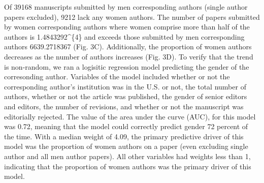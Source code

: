 \documentclass[11pt,]{article}
\begin{document}
Of 39168 manuscripts submitted by men corresponding authors (single
author papers excluded), 9212 lack any women authors. The number of
papers submitted by women corresponding authors where women comprise
more than half of the authors is 1.4843292\^{}\{4\} and exceeds
those submitted by men corresponding authors 6639.2718367 (Fig. 3C).
Additionally, the proportion of women authors decreases as the number of
authors increases (Fig. 3D). To verify that the trend is non-random, we
ran a logisitic regression model predicting the gender of the
corresonding author. Variables of the model included whether or not the
corresponding author's institution was in the U.S. or not, the total
number of authors, whether or not the article was published, the gender
of senior editors and editors, the number of revisions, and whether or
not the manuscript was editorially rejected. The value of the area under
the curve (AUC), for this model was 0.72, meaning that the model could
correctly predict gender 72 percent of the time. With a median weight of
4.09, the primary predictive driver of this model was the proportion of
women authors on a paper (even excluding single author and all men
author papers). All other variables had weights less than 1, indicating
that the proportion of women authors was the primary driver of this
model.
\end{document}
